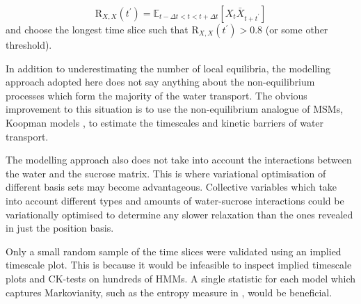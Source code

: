 \begin{equation}
\mathrm{R}_{X,  X}(t^{\prime})=\mathbb{E}_{t-\Delta t < t < t+\Delta t}\left[X_{t} \bar{X}_{t+t^{\prime}}\right]
\end{equation}
and choose the longest time slice such that $\mathrm{R}_{X,  X}(t^{\prime}) > 0.8$ (or some other threshold). 

In addition to underestimating the number of local equilibria, the modelling approach adopted here does not say anything about the non-equilibrium processes which form the majority of the water transport. The obvious improvement to this situation is to use the non-equilibrium analogue of MSMs, Koopman models \cite{wuVariationalApproachLearning2019}, to estimate the timescales and kinetic barriers of water transport. 

The modelling approach also does not take into account the interactions between the water and the sucrose matrix. This is where variational optimisation of different basis sets may become advantageous. Collective variables which take into account different types and amounts of water-sucrose interactions could be variationally optimised to determine any slower  relaxation than the ones revealed in just the position basis.

Only a small random sample of the time slices were validated using an implied timescale plot. This is because it would be infeasible to inspect implied timescale plots and CK-tests on hundreds of HMMs. A single statistic for each model  which captures Markovianity, such as the entropy measure in \cite{parkValidationMarkovState2006}, would be beneficial. 




